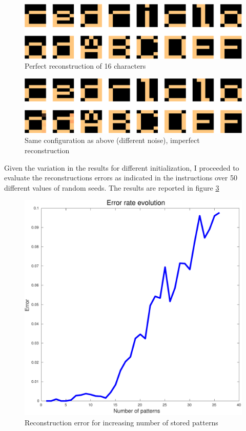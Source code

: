 \documentclass[11pt, a4paper]{article}
\begin{document}
\begin{figure}[H]
  \centering
  \includegraphics[scale=.30]{hopfield_spurious_rnd7.png}
  \caption{Perfect reconstruction of 16 characters}
  \label{fig:hopfield_rnd7}
\end{figure}

\begin{figure}[H]
  \centering
  \includegraphics[scale=.30]{hopfield_spurious_rnd8.png}
  \caption{Same configuration as above (different noise), imperfect reconstruction}
  \label{fig:hopfield_rnd8}
\end{figure}

Given the variation in the results for different initialization, I
proceeded to evaluate the reconstructions errors as indicated in the
instructions over 50 different values of random seeds. The results are
reported in figure \ref{fig:hopfield_error}

\begin{figure}[H]
  \centering
  \includegraphics[scale=.50]{hopfield_error.pdf}
  \caption{Reconstruction error for increasing number of stored patterns}
  \label{fig:hopfield_error}
\end{figure}
\end{document}
